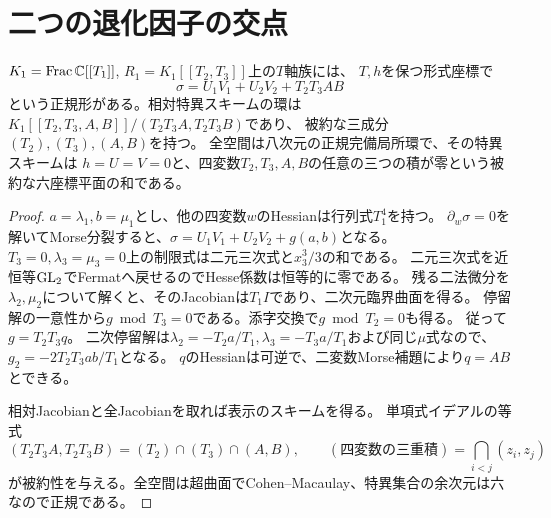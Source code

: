 \section{二つの退化因子の交点}
\begin{theorem}
$K_1=\operatorname{Frac}\mathbb C[[T_1]]$, $R_1=K_1[[T_2,T_3]]$上の$T$軸族には、
$T,h$を保つ形式座標で
\[
 \sigma=U_1V_1+U_2V_2+T_2T_3AB
\]
という正規形がある。相対特異スキームの環は
$K_1[[T_2,T_3,A,B]]/(T_2T_3A,T_2T_3B)$であり、
被約な三成分$(T_2),(T_3),(A,B)$を持つ。
全空間は八次元の正規完備局所環で、その特異スキームは
$h=U=V=0$と、四変数$T_2,T_3,A,B$の任意の三つの積が零という被約な六座標平面の和である。
\end{theorem}
\begin{proof}
$a=\lambda_1,b=\mu_1$とし、他の四変数$w$のHessianは行列式$T_1^4$を持つ。
$\partial_w\sigma=0$を解いてMorse分裂すると、$\sigma=U_1V_1+U_2V_2+g(a,b)$となる。
$T_3=0,\lambda_3=\mu_3=0$上の制限式は二元三次式と$x_3^3/3$の和である。
二元三次式を近恒等$\operatorname{GL}_2$でFermatへ戻せるのでHesse係数は恒等的に零である。
残る二法微分を$\lambda_2,\mu_2$について解くと、そのJacobianは$T_1I$であり、二次元臨界曲面を得る。
停留解の一意性から$g\bmod T_3=0$である。添字交換で$g\bmod T_2=0$も得る。
従って$g=T_2T_3q$。
二次停留解は$\lambda_2=-T_2a/T_1,\lambda_3=-T_3a/T_1$および同じ$\mu$式なので、
$g_2=-2T_2T_3ab/T_1$となる。
$q$のHessianは可逆で、二変数Morse補題により$q=AB$とできる。

相対Jacobianと全Jacobianを取れば表示のスキームを得る。
単項式イデアルの等式
\[
 (T_2T_3A,T_2T_3B)=(T_2)\cap(T_3)\cap(A,B),\qquad
 (\text{四変数の三重積})=\bigcap_{i<j}(z_i,z_j)
\]
が被約性を与える。全空間は超曲面でCohen--Macaulay、特異集合の余次元は六なので正規である。
\end{proof}

